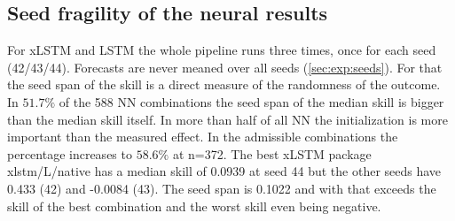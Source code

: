 \subsection{Seed fragility of the neural results}
\label{sec:lim:seeds}
For xLSTM and LSTM the whole pipeline runs three times, once for each seed (42/43/44). Forecasts are never meaned over all seeds (\cref{sec:exp:seeds}). For that the seed span of the skill is a direct measure of the randomness of the outcome. In $51.7\%$ of the 588 NN combinations the seed span of the median skill is bigger than the median skill itself. In more than half of all NN the initialization is more important than the measured effect. In the admissible combinations the percentage increases to $58.6\%$ at n=372.
The best xLSTM package xlstm/L/native has a median skill of 0.0939 at seed 44 but the other seeds have 0.433 (42) and -0.0084 (43). The seed span is 0.1022 and with that exceeds the skill of the best combination and the worst skill even being negative. 

